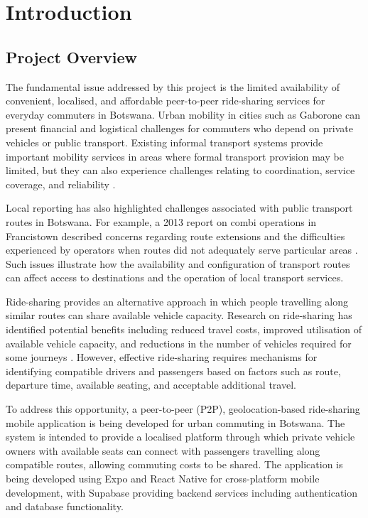 \chapter{Introduction}
\label{ch:intro}

\section{Project Overview}

The fundamental issue addressed by this project is the limited availability of convenient, localised, and affordable peer-to-peer ride-sharing services for everyday commuters in Botswana. Urban mobility in cities such as Gaborone can present financial and logistical challenges for commuters who depend on private vehicles or public transport. Existing informal transport systems provide important mobility services in areas where formal transport provision may be limited, but they can also experience challenges relating to coordination, service coverage, and reliability \citep{cervero2007}.

Local reporting has also highlighted challenges associated with public transport routes in Botswana. For example, a 2013 report on combi operations in Francistown described concerns regarding route extensions and the difficulties experienced by operators when routes did not adequately serve particular areas \citep{kebareng2013}. Such issues illustrate how the availability and configuration of transport routes can affect access to destinations and the operation of local transport services.

Ride-sharing provides an alternative approach in which people travelling along similar routes can share available vehicle capacity. Research on ride-sharing has identified potential benefits including reduced travel costs, improved utilisation of available vehicle capacity, and reductions in the number of vehicles required for some journeys \citep{agatz2012,furuhata2013}. However, effective ride-sharing requires mechanisms for identifying compatible drivers and passengers based on factors such as route, departure time, available seating, and acceptable additional travel.

To address this opportunity, a peer-to-peer (P2P), geolocation-based ride-sharing mobile application is being developed for urban commuting in Botswana. The system is intended to provide a localised platform through which private vehicle owners with available seats can connect with passengers travelling along compatible routes, allowing commuting costs to be shared. The application is being developed using Expo and React Native for cross-platform mobile development, with Supabase providing backend services including authentication and database functionality.

